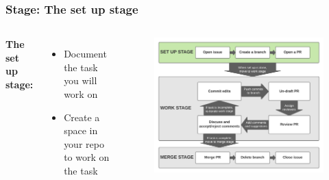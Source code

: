 \documentclass[aspectratio=169]{beamer} %
\begin{document}
\begin{frame}
	\frametitle{Stage: The set up stage}
	\begin{columns}[c]


		\Large \textbf{The set up stage:}
		\vspace{1em}
		\normalsize

		\begin{itemize}
			\setlength\itemsep{1em}
			\item Document the task you will work on
			\item Create a space in your repo to work on the task
		\end{itemize}

		\vspace{-.75cm}
		\begin{figure}
			\centering
			\includegraphics[width=\textwidth]{./img/branch-pr-merge-cycle-S1.png}
		\end{figure}

	\end{columns}
\end{frame}
\end{document}
